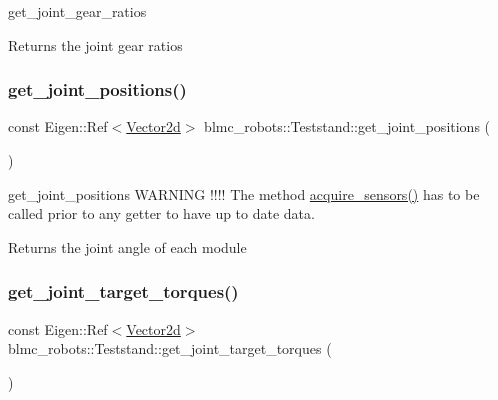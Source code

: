 get\+\_\+joint\+\_\+gear\+\_\+ratios 

\begin{DoxyReturn}{Returns}
the joint gear ratios 
\end{DoxyReturn}
\mbox{\label{classblmc__robots_1_1Teststand_adf08db3dbb4fd8da74c8ef15fb393c1a}} 
\subsubsection{\texorpdfstring{get\+\_\+joint\+\_\+positions()}{get\_joint\_positions()}}
{\footnotesize\ttfamily const Eigen\+::\+Ref$<$\hyperlink{common__header_8hpp_acb6916bc8c9fe9d98c484fd4cc201447}{Vector2d}$>$ blmc\+\_\+robots\+::\+Teststand\+::get\+\_\+joint\+\_\+positions (\begin{DoxyParamCaption}{ }\end{DoxyParamCaption})\hspace{0.3cm}{\ttfamily [inline]}}



get\+\_\+joint\+\_\+positions W\+A\+R\+N\+I\+NG !!!! The method \hyperlink{classblmc__robots_1_1Teststand_a4203e25148ab5b4ddfef3b46647213c6}{acquire\+\_\+sensors()} has to be called prior to any getter to have up to date data. 

\begin{DoxyReturn}{Returns}
the joint angle of each module 
\end{DoxyReturn}
\mbox{\label{classblmc__robots_1_1Teststand_a0aa762511624791e4ccbec5ad664371f}} 
\subsubsection{\texorpdfstring{get\+\_\+joint\+\_\+target\+\_\+torques()}{get\_joint\_target\_torques()}}
{\footnotesize\ttfamily const Eigen\+::\+Ref$<$\hyperlink{common__header_8hpp_acb6916bc8c9fe9d98c484fd4cc201447}{Vector2d}$>$ blmc\+\_\+robots\+::\+Teststand\+::get\+\_\+joint\+\_\+target\+\_\+torques (\begin{DoxyParamCaption}{ }\end{DoxyParamCaption})\hspace{0.3cm}{\ttfamily [inline]}}



